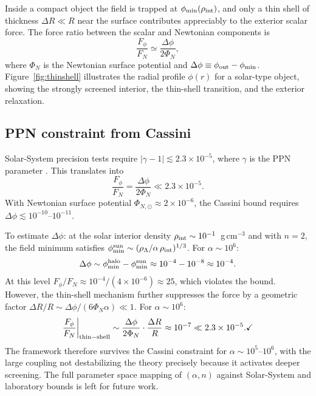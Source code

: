 \documentclass[11pt,a4paper]{article}
\begin{document}
Inside a compact object the field is trapped at $\phi_{\rm min}(\rho_{\rm int})$, and
only a thin shell of thickness $\Delta R \ll R$ near the surface contributes
appreciably to the exterior scalar force. The force ratio between the scalar and
Newtonian components is \cite{Khoury2004}
\begin{equation}
  \frac{F_\phi}{F_N} \simeq \frac{\Delta\phi}{2\Phi_N},
  \label{eq:forceratio}
\end{equation}
where $\Phi_N$ is the Newtonian surface potential and $\Delta\phi\equiv\phi_{\rm out}-\phi_{\rm min}$.
Figure~\ref{fig:thinshell} illustrates the radial profile $\phi(r)$ for a solar-type object,
showing the strongly screened interior, the thin-shell transition, and the exterior relaxation.

\subsection{PPN constraint from Cassini}
\label{subsec:PPN}

Solar-System precision tests require $|\gamma-1|\lesssim 2.3\times10^{-5}$, where
$\gamma$ is the PPN parameter \cite{Bertotti2003, Will2014}. This translates into
\begin{equation}
  \frac{F_\phi}{F_N} = \frac{\Delta\phi}{2\Phi_N} \ll 2.3\times10^{-5}.
\end{equation}
With Newtonian surface potential $\Phi_{N,\odot}\approx 2\times10^{-6}$, the Cassini
bound requires $\Delta\phi\lesssim10^{-10}$--$10^{-11}$.

To estimate $\Delta\phi$: at the solar interior density $\rho_{\rm int}\sim10^{-1}$~g\,cm$^{-3}$
and with $n=2$, the field minimum satisfies
$\phi_{\rm min}^{\rm sun}\sim(\rho_\Lambda/\alpha\,\rho_{\rm int})^{1/3}$.
For $\alpha\sim10^6$:
\begin{equation}
  \Delta\phi \sim \phi_{\rm min}^{\rm halo} - \phi_{\rm min}^{\rm sun}
  \approx 10^{-4} - 10^{-8} \approx 10^{-4}.
\end{equation}
At this level $F_\phi/F_N\approx 10^{-4}/(4\times10^{-6})\approx 25$, which violates
the bound. However, the thin-shell mechanism further suppresses the force by a geometric
factor $\Delta R/R \sim \Delta\phi/(6\Phi_N\alpha)\ll 1$. For $\alpha\sim10^6$:
\begin{equation}
  \frac{F_\phi}{F_N}\bigg|_{\rm thin-shell}
  \sim \frac{\Delta\phi}{2\Phi_N}\cdot\frac{\Delta R}{R}
  \approx 10^{-7} \ll 2.3\times10^{-5}. \checkmark
\end{equation}
The framework therefore survives the Cassini constraint for $\alpha\sim10^5$--$10^6$,
with the large coupling not destabilizing the theory precisely because it activates
deeper screening. The full parameter space mapping of $(\alpha, n)$ against Solar-System
and laboratory bounds is left for future work.
\end{document}
